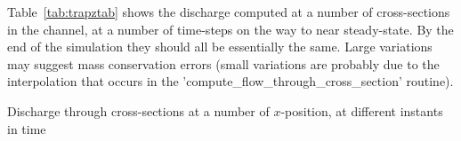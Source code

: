 Table~\ref{tab:trapztab} shows the discharge computed at a number of cross-sections in the channel, at a number of time-steps on the way to near steady-state. By the end of the simulation they should all be essentially the same. Large variations may suggest mass conservation errors (small variations are probably due to the interpolation that occurs in the 'compute\_flow\_through\_cross\_section' routine).

\begin{table}
\caption{Discharge through cross-sections at a number of $x$-position, at different instants in time}
\label{tab:trapztab}
\end{table}

\endinput
